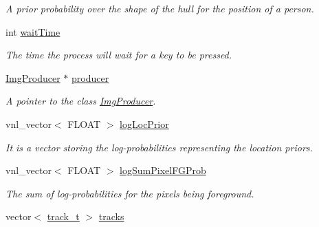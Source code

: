 \begin{DoxyCompactItemize}
\begin{DoxyCompactList}\small\item\em A prior probability over the shape of the hull for the position of a person. \item\end{DoxyCompactList}\item 
\hypertarget{classfindPersonStream_a3ef28bb668b8c7fa599838e65c9f7796}{
int \hyperlink{classfindPersonStream_a3ef28bb668b8c7fa599838e65c9f7796}{waitTime}}
\label{classfindPersonStream_a3ef28bb668b8c7fa599838e65c9f7796}

\begin{DoxyCompactList}\small\item\em The time the process will wait for a key to be pressed. \item\end{DoxyCompactList}\item 
\hypertarget{classfindPersonStream_a07b7f59f003c8581fca9c1ef6d7fac33}{
\hyperlink{classImgProducer}{ImgProducer} $\ast$ \hyperlink{classfindPersonStream_a07b7f59f003c8581fca9c1ef6d7fac33}{producer}}
\label{classfindPersonStream_a07b7f59f003c8581fca9c1ef6d7fac33}

\begin{DoxyCompactList}\small\item\em A pointer to the class {\ttfamily \hyperlink{classImgProducer}{ImgProducer}}. \item\end{DoxyCompactList}\item 
\hypertarget{classfindPersonStream_a337c4cd7f149bc0c775c244d75ed9293}{
vnl\_\-vector$<$ FLOAT $>$ \hyperlink{classfindPersonStream_a337c4cd7f149bc0c775c244d75ed9293}{logLocPrior}}
\label{classfindPersonStream_a337c4cd7f149bc0c775c244d75ed9293}

\begin{DoxyCompactList}\small\item\em It is a vector storing the log-\/probabilities representing the location priors. \item\end{DoxyCompactList}\item 
\hypertarget{classfindPersonStream_a5dba19cc173c5e14c312c82893407051}{
vnl\_\-vector$<$ FLOAT $>$ \hyperlink{classfindPersonStream_a5dba19cc173c5e14c312c82893407051}{logSumPixelFGProb}}
\label{classfindPersonStream_a5dba19cc173c5e14c312c82893407051}

\begin{DoxyCompactList}\small\item\em The sum of log-\/probabilities for the pixels being foreground. \item\end{DoxyCompactList}\item 
\hypertarget{classfindPersonStream_a0fa099d5bc4bb08195c1d4b0cd2d3f00}{
vector$<$ \hyperlink{structtrack__t}{track\_\-t} $>$ \hyperlink{classfindPersonStream_a0fa099d5bc4bb08195c1d4b0cd2d3f00}{tracks}}
\label{classfindPersonStream_a0fa099d5bc4bb08195c1d4b0cd2d3f00}


\end{DoxyCompactItemize}
